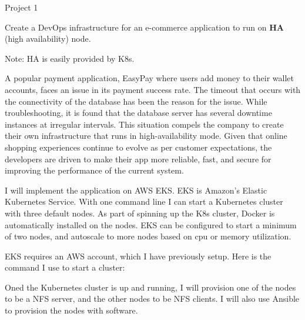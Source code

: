 %
%




%


\twelvepoint


\ms

Project 1


\ms

Create a DevOps infrastructure for an e-commerce application to run on {\bf HA\/} (high availability) node.

Note: HA is easily provided by K8s.

\bs


\ms

A popular payment application, EasyPay where users add money to their wallet accounts, faces an issue in its payment success rate. The timeout that occurs with
the connectivity of the database has been the reason for the issue.
While troubleshooting, it is found that the database server has several downtime instances at irregular intervals. This situation compels the company to create their own infrastructure that runs in high-availability mode.
Given that online shopping experiences continue to evolve as per customer expectations, the developers are driven to make their app more reliable, fast, and secure for improving the performance of the current system.

\bs


I will implement the application on AWS EKS.  EKS is Amazon's Elastic Kubernetes Service. 
With one command line I can start a Kubernetes cluster with three default nodes. As part of spinning up the K8s cluster, Docker is automatically installed on the nodes.
EKS can be configured to start a minimum of two nodes, and autoscale to more nodes based on cpu or memory utilization.

EKS requires an AWS account, which I have previously setup.  Here is the command I use to start a cluster:




Oned the Kubernetes cluster is up and running, I will provision one of the nodes to be a NFS server, and the other nodes to be NFS clients.  I will also use Ansible
to provision the nodes with software.

\ms

